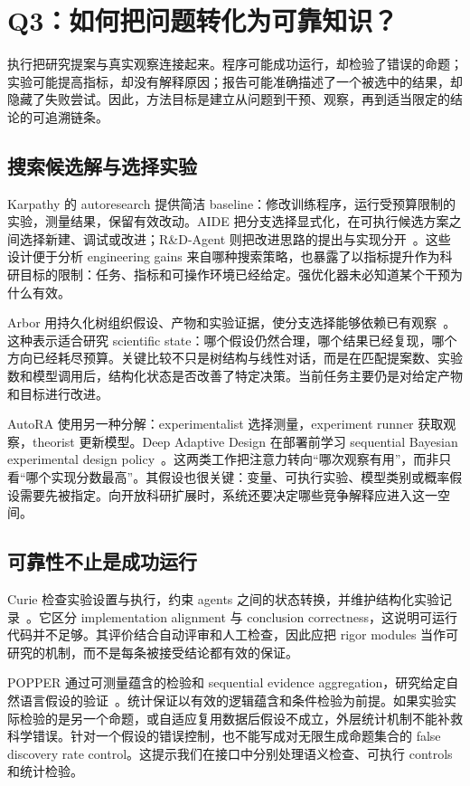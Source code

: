 \section{Q3：如何把问题转化为可靠知识？}
\label{sec:execution}

执行把研究提案与真实观察连接起来。程序可能成功运行，却检验了错误的命题；实验可能提高指标，却没有解释原因；报告可能准确描述了一个被选中的结果，却隐藏了失败尝试。因此，方法目标是建立从问题到干预、观察，再到适当限定的结论的可追溯链条。

\subsection{搜索候选解与选择实验}

Karpathy 的 autoresearch 提供简洁 baseline：修改训练程序，运行受预算限制的实验，测量结果，保留有效改动。AIDE 把分支选择显式化，在可执行候选方案之间选择新建、调试或改进；R\&D-Agent 则把改进思路的提出与实现分开~\cite{autoresearch,aide,rd-agent}。这些设计便于分析 engineering gains 来自哪种搜索策略，也暴露了以指标提升作为科研目标的限制：任务、指标和可操作环境已经给定。强优化器未必知道某个干预为什么有效。

Arbor 用持久化树组织假设、产物和实验证据，使分支选择能够依赖已有观察~\cite{arbor}。这种表示适合研究 scientific state：哪个假设仍然合理，哪个结果已经复现，哪个方向已经耗尽预算。关键比较不只是树结构与线性对话，而是在匹配提案数、实验数和模型调用后，结构化状态是否改善了特定决策。当前任务主要仍是对给定产物和目标进行改进。

AutoRA 使用另一种分解：experimentalist 选择测量，experiment runner 获取观察，theorist 更新模型。Deep Adaptive Design 在部署前学习 sequential Bayesian experimental design policy~\cite{autora,deep-adaptive-design}。这两类工作把注意力转向“哪次观察有用”，而非只看“哪个实现分数最高”。其假设也很关键：变量、可执行实验、模型类别或概率假设需要先被指定。向开放科研扩展时，系统还要决定哪些竞争解释应进入这一空间。

\subsection{可靠性不止是成功运行}

Curie 检查实验设置与执行，约束 agents 之间的状态转换，并维护结构化实验记录~\cite{curie}。它区分 implementation alignment 与 conclusion correctness，这说明可运行代码并不足够。其评价结合自动评审和人工检查，因此应把 rigor modules 当作可研究的机制，而不是每条被接受结论都有效的保证。

POPPER 通过可测量蕴含的检验和 sequential evidence aggregation，研究给定自然语言假设的验证~\cite{popper}。统计保证以有效的逻辑蕴含和条件检验为前提。如果实验实际检验的是另一个命题，或自适应复用数据后假设不成立，外层统计机制不能补救科学错误。针对一个假设的错误控制，也不能写成对无限生成命题集合的 false discovery rate control。这提示我们在接口中分别处理语义检查、可执行 controls 和统计检验。

